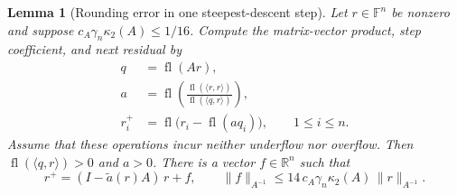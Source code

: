 \documentclass[11pt]{article}
\newtheorem{lemma}{Lemma}
\theoremstyle{definition}
\newcommand{\fl}{\operatorname{fl}}
\newcommand{\R}{\mathbb{R}}
\begin{document}
\begin{lemma}[Rounding error in one steepest-descent step]
\label{lem:sd-one-step}
Let $r\in\mathbb F^n$ be nonzero and suppose
$c_A\gamma_n\kappa_2(A)\le1/16$.
Compute the matrix-vector product, step coefficient, and next residual by
\[
\begin{aligned}
 q&=\fl(Ar),\\
 a&=\fl\!\left(
       \frac{\fl(\langle r,r\rangle)}{\fl(\langle q,r\rangle)}
       \right),\\
 r_i^+&=\fl\bigl(r_i-\fl(aq_i)\bigr),\qquad 1\le i\le n.
\end{aligned}
\]
Assume that these operations incur neither underflow nor overflow.
Then $\fl(\langle q,r\rangle)>0$ and $a>0$.
There is a vector $f\in\R^n$ such that
\begin{equation}
 r^+=(I-\tilde a(r)A)\,r+f,
 \qquad
 \|f\|_{A^{-1}}\le14\,c_A\gamma_n\kappa_2(A)\,\|r\|_{A^{-1}} .
 \label{eq:sd-perturbed-step}
\end{equation}
\end{lemma}
\end{document}
